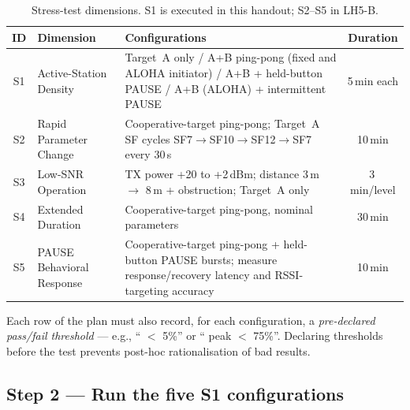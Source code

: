 \documentclass[11pt,letterpaper]{article}
\begin{document}
\begin{table}[h!]
	\centering
	\renewcommand{\arraystretch}{1.3}
	\begin{tabularx}{\textwidth}{c l X c}
		\toprule
		\textbf{ID} & \textbf{Dimension} & \textbf{Configurations} & \textbf{Duration} \\
		\midrule
		S1 & Active-Station Density & Target~A only / A+B ping-pong (fixed and ALOHA initiator) / A+B + held-button PAUSE / A+B (ALOHA) + intermittent PAUSE & 5\,min each \\
		S2 & Rapid Parameter Change & Cooperative-target ping-pong; Target~A SF cycles SF7$\to$SF10$\to$SF12$\to$SF7 every 30\,s & 10\,min \\
		S3 & Low-\mbox{SNR} Operation & \mbox{TX} power +20 to +2\,dBm; distance 3\,m $\to$ 8\,m + obstruction; Target~A only & 3\,min/level \\
		S4 & Extended Duration     & Cooperative-target ping-pong, nominal parameters & 30\,min \\
		S5 & PAUSE Behavioral Response & Cooperative-target ping-pong + held-button PAUSE bursts; measure response/recovery latency and RSSI-targeting accuracy & 10\,min \\
		\bottomrule
	\end{tabularx}
	\caption{Stress-test dimensions. S1 is executed in this handout; S2--S5 in LH5-B.}
\end{table}

Each row of the plan must also record, for each configuration, a \emph{pre-declared pass/fail threshold} --- e.g., ``\PER{} $<$ 5\%'' or ``\FIFO{} peak $<$ 75\%''. Declaring thresholds before the test prevents post-hoc rationalisation of bad results.

\subsection{Step 2 --- Run the five S1 configurations}
\end{document}
